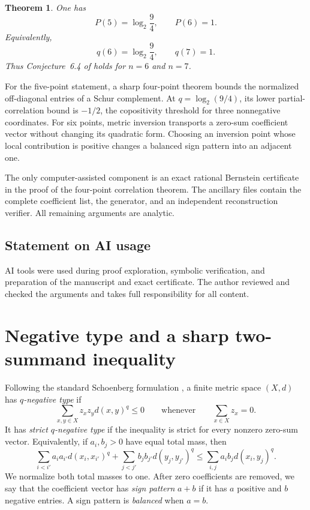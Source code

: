 \documentclass[11pt]{amsart}
\newtheorem{theorem}{Theorem}[section]
\theoremstyle{definition}
\theoremstyle{remark}
\begin{document}
\begin{theorem}\label{thm:main}
One has
\[
 P(5)=\log_2\frac94,
 \qquad
 P(6)=1.
\]
Equivalently,
\[
 q(6)=\log_2\frac94,
 \qquad
 q(7)=1.
\]
Thus Conjecture~6.4 of \cite{BHKL} holds for $n=6$ and $n=7$.
\end{theorem}

For the five-point statement, a sharp four-point theorem bounds the
normalized off-diagonal entries of a Schur complement. At
$q=\log_2(9/4)$, its lower partial-correlation bound is $-1/2$, the
copositivity threshold for three nonnegative coordinates. For six points,
metric inversion transports a zero-sum coefficient vector without changing
its quadratic form. Choosing an inversion point whose local contribution is
positive changes a balanced sign pattern into an adjacent one.

The only computer-assisted component is an exact rational Bernstein
certificate in the proof of the four-point correlation theorem. The
ancillary files contain the complete coefficient list, the generator, and
an independent reconstruction verifier. All remaining arguments are
analytic.

\subsection*{Statement on AI usage}
AI tools were used during proof exploration, symbolic verification, and
preparation of the manuscript and exact certificate. The author reviewed
and checked the arguments and takes full responsibility for all content.

\section{Negative type and a sharp two-summand inequality}

Following the standard Schoenberg formulation \cite{Schoenberg}, a finite metric space $(X,d)$ has \emph{$q$-negative type} if
\[
 \sum_{x,y\in X}z_xz_y d(x,y)^q\le0
 \qquad\text{whenever}\qquad
 \sum_{x\in X}z_x=0.
\]
It has \emph{strict $q$-negative type} if the inequality is strict for
every nonzero zero-sum vector.
Equivalently, if $a_i,b_j>0$ have equal total mass, then
\begin{equation}\label{eq:generalized-roundness}
 \sum_{i<i'}a_ia_{i'}d(x_i,x_{i'})^q
 +\sum_{j<j'}b_jb_{j'}d(y_j,y_{j'})^q
 \le
 \sum_{i,j}a_ib_jd(x_i,y_j)^q.
\end{equation}
We normalize both total masses to one. After zero coefficients are
removed, we say that the coefficient vector has \emph{sign pattern}
$a+b$ if it has $a$ positive and $b$ negative entries. A sign pattern is
\emph{balanced} when $a=b$.
\end{document}
